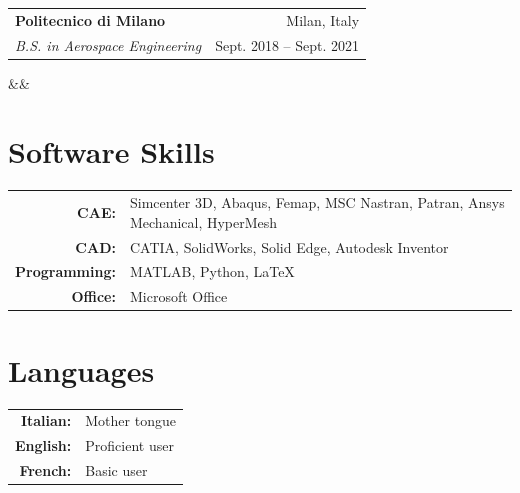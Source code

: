 \documentclass[10pt, a4paper]{article}
\makeatletter
\newcommand{\cventry}[5]{%
  \noindent\begin{tabularx}{\textwidth}{@{}X r@{}}
    \textbf{#2} & #3 \\
    \textit{#1} & \textcolor{datecolor}{#4} \\
  \end{tabularx}
  \ifx&#5&\else
    \vspace{-0.5em}
    #5
  \fi
  \vspace{0.1em}
}
\newcommand{\cvskillrow}[2]{%
  \textbf{#1:} & #2 \\[0.2em]
}
\makeatother
\begin{document}
\vspace{0.6em}

\cventry
  {B.S. in Aerospace Engineering}
  {Politecnico di Milano}
  {Milan, Italy}
  {Sept. 2018 -- Sept. 2021}
  {}

\section{Software Skills}

\vspace{0.3em}
\noindent\begin{tabularx}{\textwidth}{@{}r X@{}}
  \cvskillrow{CAE}{Simcenter 3D, Abaqus, Femap, MSC Nastran, Patran, Ansys Mechanical, HyperMesh}
  \cvskillrow{CAD}{CATIA, SolidWorks, Solid Edge, Autodesk Inventor}
  \cvskillrow{Programming}{MATLAB, Python, LaTeX}
  \cvskillrow{Office}{Microsoft Office}
\end{tabularx}

\section{Languages}

\vspace{0.3em}
\noindent\begin{tabularx}{\textwidth}{@{}r X@{}}
  \cvskillrow{Italian}{Mother tongue}
  \cvskillrow{English}{Proficient user}
  \cvskillrow{French}{Basic user}
\end{tabularx}
\end{document}
